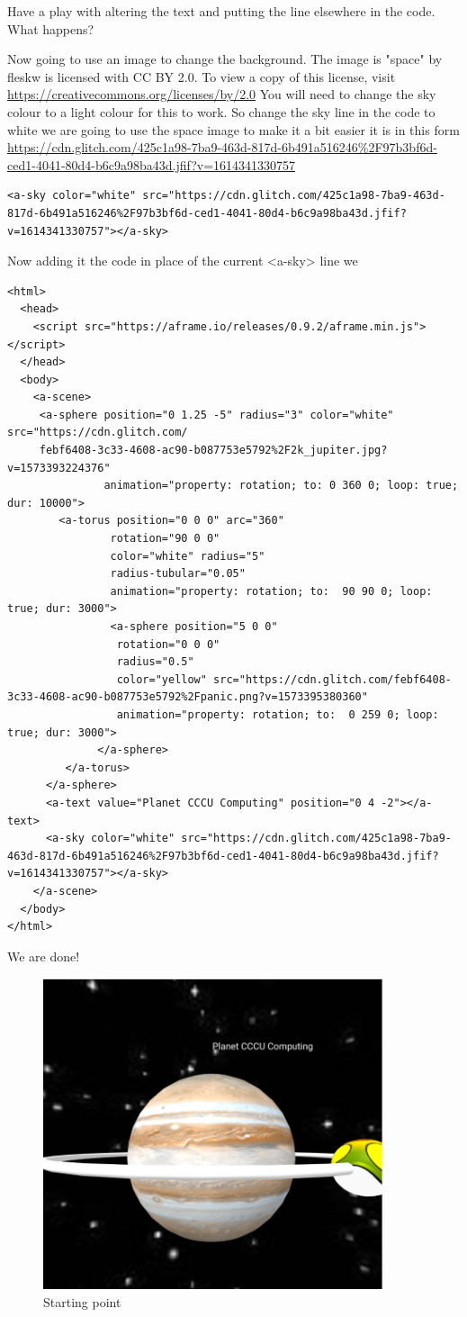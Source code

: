 Have a play with altering the text and putting the line elsewhere in the code. What happens?

Now going to use an image to change the background. The image is "space" by fleskw is licensed with CC BY 2.0. To view a copy of this license, visit \url{https://creativecommons.org/licenses/by/2.0} You will need to change the sky colour to a light colour for this to work. So change the sky line in the code to white we are going to use the space image to make it a bit easier it is in this form \url{https://cdn.glitch.com/425c1a98-7ba9-463d-817d-6b491a516246%2F97b3bf6d-ced1-4041-80d4-b6c9a98ba43d.jfif?v=1614341330757} 

\begin{lstlisting}
<a-sky color="white" src="https://cdn.glitch.com/425c1a98-7ba9-463d-817d-6b491a516246%2F97b3bf6d-ced1-4041-80d4-b6c9a98ba43d.jfif?v=1614341330757"></a-sky>
\end{lstlisting}
Now adding it the code in place of the current <a-sky> line we 
\begin{lstlisting}
<html>
  <head>
    <script src="https://aframe.io/releases/0.9.2/aframe.min.js"></script>
  </head>
  <body>
    <a-scene>
     <a-sphere position="0 1.25 -5" radius="3" color="white" src="https://cdn.glitch.com/
     febf6408-3c33-4608-ac90-b087753e5792%2F2k_jupiter.jpg?v=1573393224376"
               animation="property: rotation; to: 0 360 0; loop: true; dur: 10000">
        <a-torus position="0 0 0" arc="360"
                rotation="90 0 0"
                color="white" radius="5"
                radius-tubular="0.05"
                animation="property: rotation; to:  90 90 0; loop: true; dur: 3000">
                <a-sphere position="5 0 0"
                 rotation="0 0 0"
                 radius="0.5"
                 color="yellow" src="https://cdn.glitch.com/febf6408-3c33-4608-ac90-b087753e5792%2Fpanic.png?v=1573395380360"
                 animation="property: rotation; to:  0 259 0; loop: true; dur: 3000">
              </a-sphere>
         </a-torus>
      </a-sphere>   
      <a-text value="Planet CCCU Computing" position="0 4 -2"></a-text>
      <a-sky color="white" src="https://cdn.glitch.com/425c1a98-7ba9-463d-817d-6b491a516246%2F97b3bf6d-ced1-4041-80d4-b6c9a98ba43d.jfif?v=1614341330757"></a-sky>
    </a-scene>
  </body>
</html>
\end{lstlisting}

We are done!

\begin{figure}
    \centering
    \includegraphics[width=10cm]{chapters/chapter2/figures/planet3.png}
    \caption{Starting point}
    \label{fig:Planet3}
\end{figure}